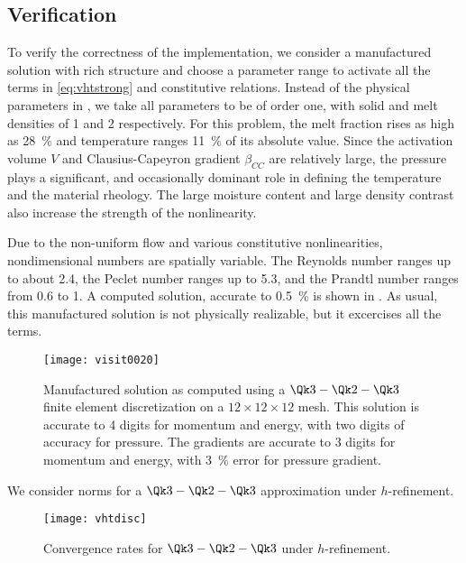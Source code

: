 \subsection{Verification}\label{ssec:vhtverif}
To verify the correctness of the implementation, we consider a manufactured solution with rich structure and choose a parameter range to activate all the terms in \eqref{eq:vhtstrong} and constitutive relations.
Instead of the physical parameters in , we take all parameters to be of order one, with solid and melt densities of 1 and 2 respectively.
For this problem, the melt fraction rises as high as \SI{28}{\percent} and temperature ranges \SI{11}{\percent} of its absolute value.
Since the activation volume $V$ and Clausius-Capeyron gradient $\beta_{CC}$ are relatively large, the pressure plays a significant, and occasionally dominant role in defining the temperature and the material rheology.
The large moisture content and large density contrast also increase the strength of the nonlinearity.

Due to the non-uniform flow and various constitutive nonlinearities, nondimensional numbers are spatially variable.
The Reynolds number ranges up to about \num{2.4}, the Peclet number ranges up to \num{5.3}, and the Prandtl number ranges from \num{0.6} to 1.
A computed solution, accurate to \SI{0.5}{\percent} is shown in .
As usual, this manufactured solution is not physically realizable, but it excercises all the terms.

\begin{figure}
  \centering\texttt{[image: visit0020]}
  \caption{Manufactured solution as computed using a $\Qk 3 - \Qk 2 - \Qk 3$ finite element discretization on a $12\times 12\times 12$ mesh.
    This solution is accurate to 4 digits for momentum and energy, with two digits of accuracy for pressure.
    The gradients are accurate to 3 digits for momentum and energy, with \SI{3}{\percent} error for pressure gradient.}\label{fig:vhtexact}
\end{figure}

We consider norms for a $\Qk 3 - \Qk 2 - \Qk 3$ approximation under $h$-refinement.

\begin{figure}
  \centering\texttt{[image: vhtdisc]}
  \caption{Convergence rates for $\Qk 3 - \Qk 2 - \Qk 3$ under $h$-refinement.}\label{fig:vhtrefine}
\end{figure}



